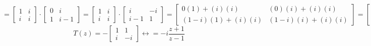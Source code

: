 \documentclass[a4paper, 10pt ]{article} %
\theoremstyle{definition}
\theoremstyle{plain}
\begin{document}
\begin{examplebox}
  \scriptsize$$
    = \begin{bmatrix}1 & i \\ i & i\end{bmatrix} \cdot \begin{bmatrix}0 & i \\ 1 & i-1\end{bmatrix}
    = \begin{bmatrix}1 & i \\ i & i\end{bmatrix} \cdot \begin{bmatrix}i & -i \\ i-1 & 1\end{bmatrix}
    = \begin{bmatrix} 0(1) + (i)(i) & (0)(i) + (i)(i) \\ (1-i)(1)+ (i)(i) & (1-i)(i) + (i)(i)\end{bmatrix}
    = \begin{bmatrix} i^2 & i^2 \\ -i & i\end{bmatrix}
  $$
  \normalsize$$T(z)  = -\begin{bmatrix}1 & 1 \\ i & -i \end{bmatrix}\longleftrightarrow = -i \frac{z+1}{z-1}$$

\end{examplebox}



\end{document}
